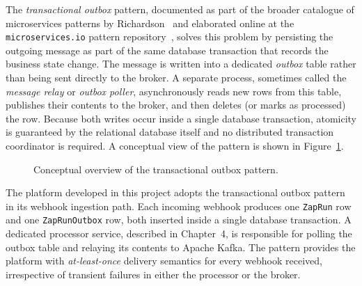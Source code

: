 The \emph{transactional outbox} pattern, documented as part of the broader catalogue of microservices patterns by Richardson~\cite{richardson2018microservices} and elaborated online at the \texttt{microservices.io} pattern repository~\cite{microservicesio_outbox}, solves this problem by persisting the outgoing message as part of the same database transaction that records the business state change. The message is written into a dedicated \emph{outbox} table rather than being sent directly to the broker. A separate process, sometimes called the \emph{message relay} or \emph{outbox poller}, asynchronously reads new rows from this table, publishes their contents to the broker, and then deletes (or marks as processed) the row. Because both writes occur inside a single database transaction, atomicity is guaranteed by the relational database itself and no distributed transaction coordinator is required. A conceptual view of the pattern is shown in Figure~\ref{fig:outbox-pattern}.

\begin{figure}[h]
\centering
{}
\caption{Conceptual overview of the transactional outbox pattern.}
\label{fig:outbox-pattern}
\end{figure}

The platform developed in this project adopts the transactional outbox pattern in its webhook ingestion path. Each incoming webhook produces one \texttt{ZapRun} row and one \texttt{ZapRunOutbox} row, both inserted inside a single database transaction. A dedicated processor service, described in Chapter~4, is responsible for polling the outbox table and relaying its contents to Apache Kafka. The pattern provides the platform with \emph{at-least-once} delivery semantics for every webhook received, irrespective of transient failures in either the processor or the broker.


